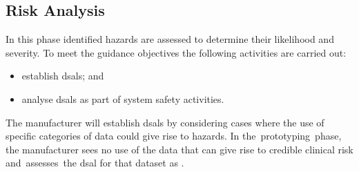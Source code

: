 \subsection{Risk Analysis}
\begin{minipage}[t]{0.73\textwidth}
  In this phase identified \glspl{hazard} are assessed to determine their likelihood and severity. To meet the guidance objectives the following activities are carried out:
  \begin{itemize}
    \item establish \glspl{dsal}; and
    \item analyse \glspl{dsal} as part of system safety activities.
  \end{itemize}
\end{minipage}
\begin{minipage}[t]{0.25\textwidth}
  \centering{}
\end{minipage}

The manufacturer will establish \glspl{dsal} by considering cases where the use of specific categories of data could give rise to \glspl{hazard}. In the\cbstart\ prototyping\cbend\ phase, the manufacturer sees no use of the data that can give rise to credible clinical risk and\cbstart\ assesses\cbend\ the \gls{dsal} for that \gls{dataset} as . 

